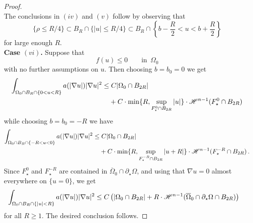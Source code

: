 \documentclass[10 pt,a4paper]{article}
\theoremstyle{definition}
\begin{document}
\begin{proof}
\[	\]
	The conclusions in $(iv)$ and $(v)$ follow by observing that 
	\[
	\{\rho \le R/4\} \subset B_R \cap \{|u| \le R/4\} \subset B_R \cap \left\{b - \frac{R}{2} < u < b + \frac{R}{2} \right\}
	\]
	for large enough $R$. \\[0.2cm]
	\textbf{Case $(vi)$.} Suppose that
	\[
		f(u) \leq 0 \qquad \text{in } \, \Omega_0
	\]
	with no further assumptions on $u$. Then choosing $b = b_0 = 0$ we get
	\begin{align*}
		\int_{\Omega_0 \cap B_R \cap \{0 < u < R\}} a(|\nabla u|) |\nabla u|^2 & \leq C|\Omega_0\cap B_{2R}| \\
		& \phantom{=\;} + C\cdot\min\{R,\sup_{F^0_\star \cap B_{2R}} |u|\} \cdot \mathscr{H}^{n-1}(F^0_\star \cap B_{2R})
	\end{align*}
	while choosing $b = b_0 = -R$ we have
	\begin{align*}
		\int_{\Omega_0 \cap B_R \cap \{-R < u < 0\}} a(|\nabla u|) |\nabla u|^2 & \leq C|\Omega_0\cap B_{2R}| \\
		& \phantom{=\;} + C\cdot\min\{R,\sup_{F^{-R}_\star \cap B_{2R}} |u+R|\} \cdot \mathscr{H}^{n-1}(F^{-R}_\star \cap B_{2R}) \, .
	\end{align*}
	Since $F^0_\star$ and $F^{-R}_\star$ are contained in $\overline{\Omega}_0 \cap \partial_\star\Omega$, and using that $\nabla u = 0$ almost everywhere on $\{u=0\}$, we get
	\begin{align*}
		\int_{\Omega_0 \cap B_R \cap \{|u| < R\}} a(|\nabla u|) |\nabla u|^2 & \leq C\left(|\Omega_0\cap B_{2R}| + R \cdot \mathscr{H}^{n-1}(\overline{\Omega}_0 \cap \partial_\star\Omega \cap B_{2R})\right)
	\end{align*}
	for all $R\geq 1$. The desired conclusion follows. 
	\end{proof}
	
\end{document}
